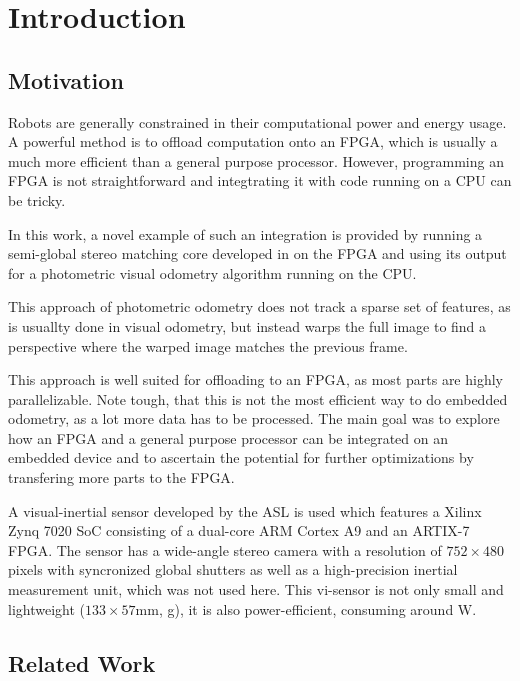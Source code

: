 \chapter{Introduction}
\label{sec:introduction}

\section{Motivation}
\label{sec:motivation}

Robots are generally constrained in their computational power and energy usage.
A powerful method is to offload computation onto an FPGA, which is usually
a much more efficient than a general purpose processor.  However, programming
an FPGA is not straightforward and integtrating it with code running on a CPU
can be tricky.

In this work, a novel example of such an integration is provided by running a
semi-global stereo matching \cite{hirschmuller2005sgm} core developed in
\cite{honegger2014sgmcore} on the FPGA and using its output for a photometric
visual odometry algorithm \cite{comport2007odometry} running on the CPU.

This approach of photometric odometry does not track a sparse set of features,
as is usuallty done in visual odometry, but instead warps the full image to
find a perspective where the warped image matches the previous frame.

This approach is well suited for offloading to an FPGA, as most parts are
highly parallelizable. Note tough, that this is not the most efficient way to do embedded odometry,
as a lot more data has to be processed. The main goal was to explore how an
FPGA and a general purpose processor can be integrated on an embedded device
and to ascertain the potential for further optimizations by transfering more
parts to the FPGA.

A visual-inertial sensor developed by the ASL \cite{nikolic2014synchronized} is
used which features a Xilinx Zynq 7020 SoC consisting of a dual-core ARM Cortex
A9 and an ARTIX-7 FPGA. The sensor has a wide-angle stereo camera with a
resolution of $752 \times 480$ pixels with syncronized global shutters as well
as a high-precision inertial measurement unit, which was not used here. This
vi-sensor is not only small and lightweight ($133 \times 57$mm, \unit[130]{g}),
it is also power-efficient, consuming around \unit[5]{W}.



\section{Related Work}
\label{sec:related_work}

